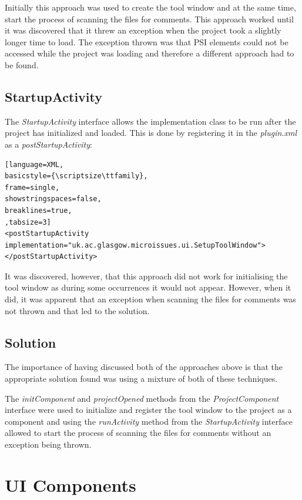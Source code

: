 \documentclass{4thYearProject}
\begin{document}
Initially this approach was used to create the tool window and at the same time, start the process of scanning the files for comments. This approach worked until it was discovered that it threw an exception when the project took a slightly longer time to load. The exception thrown was that PSI elements could not be accessed while the project was loading and therefore a different approach had to be found. 

\subsection{StartupActivity}

The \textit{StartupActivity} interface allows the implementation class to be run after the project has initialized and loaded. This is done by registering it in the \textit{plugin.xml} as a \textit{postStartupActivity}:   \\

\begin{lstlisting}[language=XML, 
basicstyle={\scriptsize\ttfamily}, 
frame=single,
showstringspaces=false,
breaklines=true,
,tabsize=3]
<postStartupActivity implementation="uk.ac.glasgow.microissues.ui.SetupToolWindow"></postStartupActivity>
\end{lstlisting}

It was discovered, however, that this approach did not work for initialising the tool window as during some occurrences it would not appear. However, when it did, it was apparent that an exception when scanning the files for comments was not thrown and that led to the solution.

\subsection{Solution}

The importance of having discussed both of the approaches above is that the appropriate solution found was using a mixture of both of these techniques. 

The \textit{initComponent} and \textit{projectOpened} methods from the \textit{ProjectComponent} interface were used to initialize and register the tool window to the project as a component and using the \textit{runActivity} method from the \textit{StartupActivity} interface allowed to start the process of scanning the files for comments without an exception being thrown.

\section{UI Components}
\end{document}
